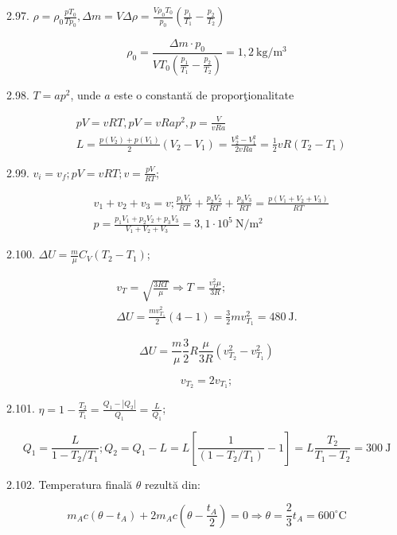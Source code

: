 \documentclass[10pt]{article}
\begin{document}
2.97. $\rho=\rho_{0} \frac{p T_{0}}{T p_{0}}, \Delta m=V \Delta \rho=\frac{V \rho_{0} T_{0}}{p_{0}}\left(\frac{p_{1}}{T_{1}}-\frac{p_{2}}{T_{2}}\right)$

$$
\rho_{0}=\frac{\Delta m \cdot p_{0}}{V T_{0}\left(\frac{p_{1}}{T_{1}}-\frac{p_{2}}{T_{2}}\right)}=1,2 \mathrm{~kg} / \mathrm{m}^{3}
$$

2.98. $T=a p^{2}$, unde $a$ este o constantă de proporţionalitate

$$
\begin{aligned}
& p V=v R T, p V=v R a p^{2}, p=\frac{V}{v R a} \\
& L=\frac{p\left(V_{2}\right)+p\left(V_{1}\right)}{2}\left(V_{2}-V_{1}\right)=\frac{V_{2}^{2}-V_{1}^{2}}{2 v R a}=\frac{1}{2} v R\left(T_{2}-T_{1}\right)
\end{aligned}
$$

2.99. $v_{i}=v_{f} ; p V=v R T ; v=\frac{p V}{R T}$;

$$
\begin{aligned}
& v_{1}+v_{2}+v_{3}=v ; \frac{p_{1} V_{1}}{R T}+\frac{p_{2} V_{2}}{R T}+\frac{p_{3} V_{3}}{R T}=\frac{p\left(V_{1}+V_{2}+V_{3}\right)}{R T} \\
& p=\frac{p_{1} V_{1}+p_{2} V_{2}+p_{3} V_{3}}{V_{1}+V_{2}+V_{3}}=3,1 \cdot 10^{5} \mathrm{~N} / \mathrm{m}^{2}
\end{aligned}
$$

2.100. $\Delta U=\frac{m}{\mu} C_{V}\left(T_{2}-T_{1}\right)$;

$$
\begin{gathered}
v_{T}=\sqrt{\frac{3 R T}{\mu}} \Rightarrow T=\frac{v_{T}^{2} \mu}{3 R} ; \\
\Delta U=\frac{m v_{T_{1}}^{2}}{2}(4-1)=\frac{3}{2} m v_{T_{1}}^{2}=480 \mathrm{~J} .
\end{gathered}
$$

$$
\Delta U=\frac{m}{\mu} \frac{3}{2} R \frac{\mu}{3 R}\left(v_{T_{2}}^{2}-v_{T_{1}}^{2}\right)
$$

$$
v_{T_{2}}=2 v_{T_{1}} ;
$$

2.101. $\eta=1-\frac{T_{2}}{T_{1}}=\frac{Q_{1}-\left|Q_{2}\right|}{Q_{1}}=\frac{L}{Q_{1}}$;

$$
Q_{1}=\frac{L}{1-T_{2} / T_{1}} ; Q_{2}=Q_{1}-L=L\left[\frac{1}{\left(1-T_{2} / T_{1}\right)}-1\right]=L \frac{T_{2}}{T_{1}-T_{2}}=300 \mathrm{~J}
$$

2.102. Temperatura finală $\theta$ rezultă din:

$$
m_{A} c\left(\theta-t_{A}\right)+2 m_{A} c\left(\theta-\frac{t_{A}}{2}\right)=0 \Rightarrow \theta=\frac{2}{3} t_{A}=600^{\circ} \mathrm{C}
$$
\end{document}
